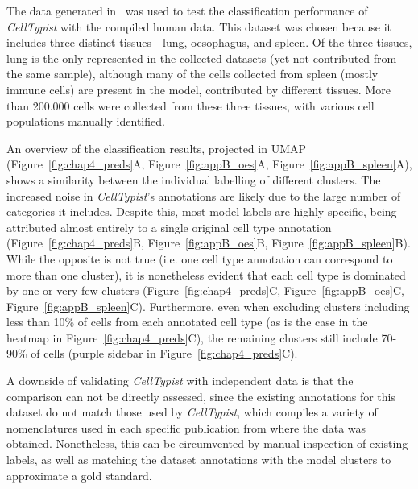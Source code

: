 The data generated in~\citep{madissoon_lung_2019} was used to test the classification performance of \textit{CellTypist} with the compiled human data. This dataset was chosen because it includes three distinct tissues - lung, oesophagus, and spleen. Of the three tissues, lung is the only represented in the collected datasets (yet not contributed from the same sample), although many of the cells collected from spleen (mostly immune cells) are present in the model, contributed by different tissues. More than 200.000 cells were collected from these three tissues, with various cell populations manually identified.

An overview of the classification results, projected in UMAP~\citep{mcinnes_umap:_2018} (Figure~\ref{fig:chap4_preds}A, Figure~\ref{fig:appB_oes}A, Figure~\ref{fig:appB_spleen}A), shows a similarity between the individual labelling of different clusters. The increased noise in \textit{CellTypist}'s annotations are likely due to the large number of categories it includes. Despite this, most model labels are highly specific, being attributed almost entirely to a single original cell type annotation (Figure~\ref{fig:chap4_preds}B, Figure~\ref{fig:appB_oes}B, Figure~\ref{fig:appB_spleen}B). While the opposite is not true (i.e. one cell type annotation can correspond to more than one cluster), it is nonetheless evident that each cell type is dominated by one or very few clusters (Figure~\ref{fig:chap4_preds}C, Figure~\ref{fig:appB_oes}C, Figure~\ref{fig:appB_spleen}C). Furthermore, even when excluding clusters including less than 10\% of cells from each annotated cell type (as is the case in the heatmap in Figure~\ref{fig:chap4_preds}C), the remaining clusters still include 70-90\% of cells (purple sidebar in Figure~\ref{fig:chap4_preds}C). 

A downside of validating \textit{CellTypist} with independent data is that the comparison can not be directly assessed, since the existing annotations for this dataset do not match those used by \textit{CellTypist}, which compiles a variety of nomenclatures used in each specific publication from where the data was obtained. Nonetheless, this can be circumvented by manual inspection of existing labels, as well as matching the dataset annotations with the model clusters to approximate a gold standard.


